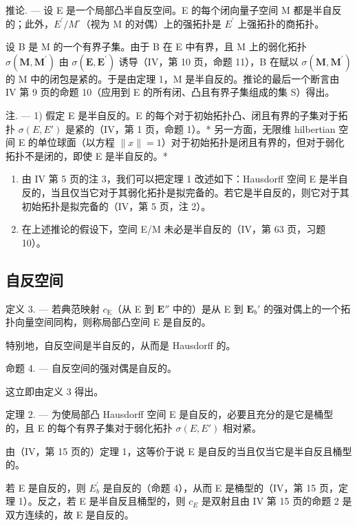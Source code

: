 推论. --- 设 E 是一个局部凸半自反空间。E 的每个闭向量子空间 M 都是半自反的；此外，\(E^{\prime}/M^{\circ}\)（视为 M 的对偶）上的强拓扑是 \(E^{\prime}\) 上强拓扑的商拓扑。

设 B 是 M 的一个有界子集。由于 B 在 E 中有界，且 M 上的弱化拓扑 \(\sigma(\mathbf{M},\mathbf{M}^{\prime})\) 由 \(\sigma(\mathbf{E},\mathbf{E}^{\prime})\) 诱导（IV，第 10 页，命题 11），B 在赋以 \(\sigma(\mathbf{M},\mathbf{M}^{\prime})\) 的 M 中的闭包是紧的。于是由定理 1，M 是半自反的。推论的最后一个断言由 IV 第 9 页的命题 10（应用到 E 的所有闭、凸且有界子集组成的集 S）得出。

注. --- 1) 假定 E 是半自反的。E 的每个对于初始拓扑凸、闭且有界的子集对于拓扑 \(\sigma(E, E')\) 是紧的（IV，第 1 页，命题 1）。* 另一方面，无限维 hilbertian 空间 E 的单位球面（以方程 \(\|x\|=1\)）对于初始拓扑是闭且有界的，但对于弱化拓扑不是闭的，即使 E 是半自反的。*

\begin{enumerate}
\def\labelenumi{\arabic{enumi})}
\setcounter{enumi}{1}
\item
  由 IV 第 5 页的注 3，我们可以把定理 1 改述如下：Hausdorff 空间 E 是半自反的，当且仅当它对于其弱化拓扑是拟完备的。若它是半自反的，则它对于其初始拓扑是拟完备的（IV，第 5 页，注 2）。
\item
  在上述推论的假设下，空间 E/M 未必是半自反的（IV，第 63 页，习题 10）。
\end{enumerate}

\subsection{自反空间}

定义 3. --- 若典范映射 \(c_{\mathrm{E}}\)（从 E 到 \(\mathbf{E}''\) 中的）是从 E 到 \(\mathbf{E}_b'\) 的强对偶上的一个拓扑向量空间同构，则称局部凸空间 E 是自反的。

特别地，自反空间是半自反的，从而是 Hausdorff 的。

命题 4. --- 自反空间的强对偶是自反的。

这立即由定义 3 得出。

定理 2. --- 为使局部凸 Hausdorff 空间 E 是自反的，必要且充分的是它是桶型的，且 E 的每个有界子集对于弱化拓扑 \(\sigma(E, E')\) 相对紧。

由（IV，第 15 页的）定理 1，这等价于说 E 是自反的当且仅当它是半自反且桶型的。

若 E 是自反的，则 \(E_{b}^{\prime}\) 是自反的（命题 4），从而 E 是桶型的（IV，第 15 页，定理 1）。反之，若 E 是半自反且桶型的，则 \(c_{E}\) 是双射且由 IV 第 15 页的命题 2 是双方连续的，故 E 是自反的。

